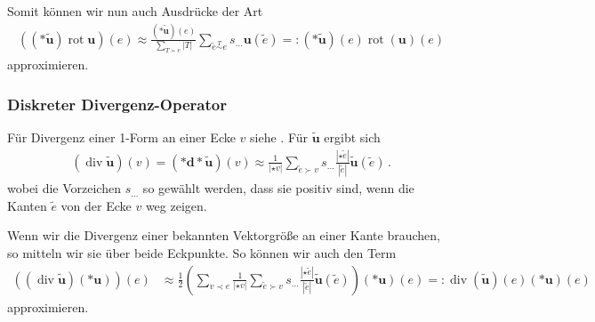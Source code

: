 \documentclass[a4paper,11pt]{scrartcl}
\newcommand{\U}{u} %
\newcommand{\Ub}{\mathbf{\U}} %
\renewcommand{\div}{\operatorname{div}} %
\newcommand{\rot}{\operatorname{rot}} %
\newcommand{\exd}{\mathbf{d}} %
\newcommand{\face}{T} %
\newcommand{\facesim}{\overset{\face}{\sim}}
\newcommand{\formPeriod}{\,\text{.}}
\begin{document}
    Somit können wir nun auch Ausdrücke der Art
    \begin{align}
      ((*\tilde{\Ub})\rot\Ub)(e) \approx \frac{(*\tilde{\Ub})(e)}{\sum_{\face\succ e}|\face|}\sum_{\tilde{e}\facesim e} s_{\ldots} \Ub(\tilde{e})
                        =: (*\tilde{\Ub})(e) \rot(\Ub)(e)
    \end{align}
    approximieren.

  \subsubsection{Diskreter Divergenz-Operator}
    Für Divergenz einer 1-Form an einer Ecke \( v \) siehe \cite{Hirani2003,DiplomIngo2014}.
    Für \( \tilde{\Ub} \) ergibt sich
    \begin{align}
      (\div\tilde{\Ub})(v) = (*\exd * \tilde{\Ub})(v) \approx \frac{1}{|\star v|}\sum_{\tilde{e}\succ v}s_{\ldots}\frac{|\star \tilde{e}|}{|\tilde{e}|}\tilde{\Ub}(\tilde{e})\formPeriod
    \end{align}
    wobei die Vorzeichen \( s_{\ldots} \) so gewählt werden, dass sie positiv sind, wenn die Kanten \( \tilde{e} \) von der Ecke \( v \) weg zeigen.

    Wenn wir die Divergenz einer bekannten Vektorgröße an einer Kante brauchen, so mitteln wir sie über beide Eckpunkte.
    So können wir auch den Term
    \begin{align}
      ((\div\tilde{\Ub})(*\Ub))(e) 
        &\approx \frac{1}{2}\left( \sum_{v\prec e} \frac{1}{|\star v|}\sum_{\tilde{e}\succ v}s_{\ldots}\frac{|\star \tilde{e}|}{|\tilde{e}|}\tilde{\Ub}(\tilde{e}) \right)
            (*\Ub)(e)
        =: \div(\tilde{\Ub})(e)(*\Ub)(e)
    \end{align}
    approximieren.
\end{document}
